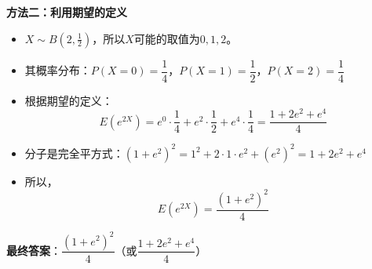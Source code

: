 \documentclass[standard]{ExBook}
\begin{document}
\begin{qitems}
\begin{bbox}
\begin{solution}
            \textbf{方法二：利用期望的定义}
            
            \begin{itemize}
                \item $X\sim B(2, \frac{1}{2})$，所以$X$可能的取值为$0, 1, 2$。
                \item 其概率分布：$P(X=0) = \dfrac{1}{4}$，$P(X=1) = \dfrac{1}{2}$，$P(X=2) = \dfrac{1}{4}$
                \item 根据期望的定义：
                    $$E(e^{2X}) = e^{0} \cdot \frac{1}{4} + e^{2} \cdot \frac{1}{2} + e^{4} \cdot \frac{1}{4} = \frac{1+2e^2+e^4}{4}$$
                \item 分子是完全平方式：$(1+e^2)^2 = 1^2 + 2 \cdot 1 \cdot e^2 + (e^2)^2 = 1+2e^2+e^4$
                \item 所以，$$E(e^{2X}) = \frac{(1+e^2)^2}{4}$$
            \end{itemize}
            
            \textbf{最终答案}：$\dfrac{(1+e^2)^2}{4}$（或$\dfrac{1+2e^2+e^4}{4}$）
        \end{solution}
    \end{bbox}

\end{qitems}
\end{document}
